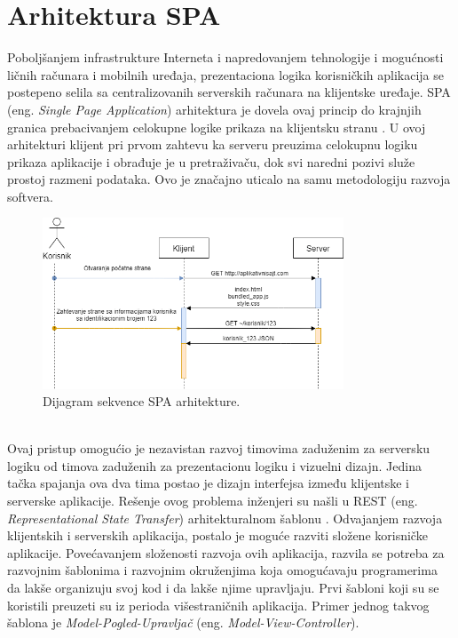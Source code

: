 \documentclass[12pt,oneside]{memoir}
\begin{document}
\chapter{Arhitektura SPA}
Poboljšanjem infrastrukture Interneta i napredovanjem tehnologije i mogućnosti
ličnih računara
i mobilnih uređaja, prezentaciona logika korisničkih aplikacija se postepeno
selila sa centralizovanih
serverskih računara na klijentske uređaje. SPA (eng. \emph{Single Page Application}) arhitektura je dovela ovaj princip
do krajnjih granica
prebacivanjem celokupne logike prikaza na klijentsku stranu \cite{SPA}. U ovoj arhitekturi klijent
pri prvom zahtevu
ka serveru preuzima celokupnu logiku prikaza aplikacije i obrađuje je u
pretraživaču, dok
svi naredni pozivi služe prostoj razmeni podataka. Ovo je značajno uticalo
na samu metodologiju razvoja softvera.
\begin{figure}[!ht]
  \centering
  \includegraphics[width=0.8\textwidth]{slike/SPA_Diagram (3).png}
  \caption{Dijagram sekvence SPA arhitekture.}
  \label{fig:SPA}
\end{figure}\\
Ovaj pristup omogućio je nezavistan razvoj timovima zaduženim za
serversku logiku od timova zaduženih za prezentacionu logiku i vizuelni dizajn.
Jedina tačka spajanja ova dva tima postao je dizajn interfejsa
između klijentske i serverske aplikacije. Rešenje ovog problema inženjeri su našli
u REST (eng. \emph{Representational State Transfer}) arhitekturalnom šablonu \cite{REST}.
Odvajanjem razvoja klijentskih i serverskih aplikacija, postalo je moguće razviti
složene korisničke aplikacije. Povećavanjem složenosti razvoja ovih aplikacija,
razvila se potreba za razvojnim šablonima i razvojnim okruženjima koja omogućavaju
programerima da lakše organizuju svoj kod i da lakše njime upravljaju.
Prvi šabloni koji su se koristili preuzeti su iz perioda višestraničnih aplikacija.
Primer jednog takvog šablona je \emph{Model-Pogled-Upravljač} (eng. \emph{Model-View-Controller})\cite{MVC}. 
\end{document}
